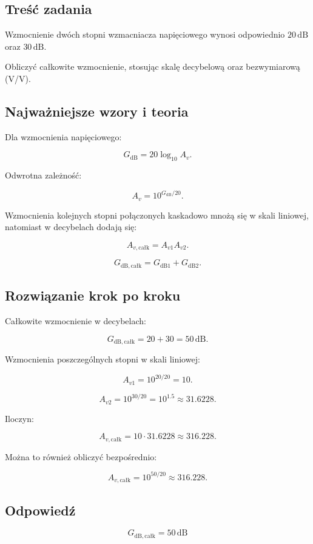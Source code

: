 \documentclass[12pt,a4paper]{article}
\begin{document}
\subsection*{Treść zadania}

Wzmocnienie dwóch stopni wzmacniacza napięciowego wynosi odpowiednio
$20\,\mathrm{dB}$ oraz $30\,\mathrm{dB}$.

Obliczyć całkowite wzmocnienie, stosując skalę decybelową
oraz bezwymiarową (V/V).

\subsection*{Najważniejsze wzory i teoria}

Dla wzmocnienia napięciowego:

\[
G_{\mathrm{dB}}=20\log_{10} A_v.
\]

Odwrotna zależność:

\[
A_v=10^{G_{\mathrm{dB}}/20}.
\]

Wzmocnienia kolejnych stopni połączonych kaskadowo mnożą się
w skali liniowej, natomiast w decybelach dodają się:

\[
A_{v,\mathrm{całk}}=A_{v1}A_{v2}.
\]

\[
G_{\mathrm{dB,całk}}
=
G_{\mathrm{dB1}}+G_{\mathrm{dB2}}.
\]

\subsection*{Rozwiązanie krok po kroku}

Całkowite wzmocnienie w decybelach:

\[
G_{\mathrm{dB,całk}}=20+30=50\,\mathrm{dB}.
\]

Wzmocnienia poszczególnych stopni w skali liniowej:

\[
A_{v1}=10^{20/20}=10.
\]

\[
A_{v2}=10^{30/20}=10^{1.5}\approx31.6228.
\]

Iloczyn:

\[
A_{v,\mathrm{całk}}
=
10\cdot31.6228
\approx316.228.
\]

Można to również obliczyć bezpośrednio:

\[
A_{v,\mathrm{całk}}
=
10^{50/20}
\approx316.228.
\]

\subsection*{Odpowiedź}

\[
\boxed{G_{\mathrm{dB,całk}}=50\,\mathrm{dB}}
\]
\end{document}

